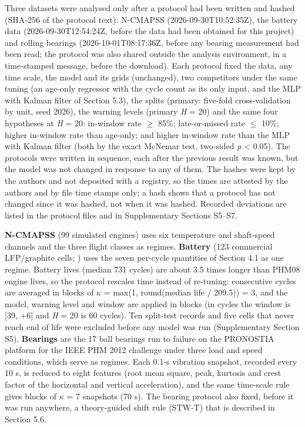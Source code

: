 \documentclass[a4paper,fleqn,doubleblind]{cas-dc}
\begin{document}
Three datasets were analysed only after a protocol had been written and hashed (SHA-256 of the protocol text): N-CMAPSS (2026-09-30T10:52:35Z), the battery data (2026-09-30T12:54:24Z, before the data had been obtained for this project) and rolling bearings (2026-10-01T08:17:36Z, before any bearing measurement had been read; the protocol was also shared outside the analysis environment, in a time-stamped message, before the download). Each protocol fixed the data, any time scale, the model and its grids (unchanged), two competitors under the same tuning (an age-only regressor with the cycle count as its only input, and the MLP with Kalman filter of Section 5.3), the splits (primary: five-fold cross-validation by unit, seed 2026), the warning levels (primary \textit{H} = 20) and the same four hypotheses at \textit{H} = 20: in-window rate $\ge$ 85\%; late-or-missed rate $\le$ 10\%; higher in-window rate than age-only; and higher in-window rate than the MLP with Kalman filter (both by the exact McNemar test, two-sided \textit{p} < 0.05). The protocols were written in sequence, each after the previous result was known, but the model was not changed in response to any of them. The hashes were kept by the authors and not deposited with a registry, so the times are attested by the authors and by file time stamps only; a hash shows that a protocol has not changed since it was hashed, not when it was hashed. Recorded deviations are listed in the protocol files and in Supplementary Sections S5--S7.

\textbf{N-CMAPSS} (99 simulated engines) uses six temperature and shaft-speed channels and the three flight classes as regimes. \textbf{Battery} (123 commercial LFP/graphite cells; \cite{severson2019}) uses the seven per-cycle quantities of Section 4.1 as one regime. Battery lives (median 731 cycles) are about 3.5 times longer than PHM08 engine lives, so the protocol rescales time instead of re-tuning: consecutive cycles are averaged in blocks of $\kappa$ = max(1, round(median life / 209.5)) = 3, and the model, warning level and window are applied in blocks (in cycles the window is [\textminus{}39, +6] and \textit{H} = 20 is 60 cycles). Ten split-test records and five cells that never reach end of life were excluded before any model was run (Supplementary Section S5). \textbf{Bearings} are the 17 ball bearings run to failure on the PRONOSTIA platform for the IEEE PHM 2012 challenge \cite{nectoux2012} under three load and speed conditions, which serve as regimes. Each 0.1-s vibration snapshot, recorded every 10 s, is reduced to eight features (root mean square, peak, kurtosis and crest factor of the horizontal and vertical acceleration), and the same time-scale rule gives blocks of $\kappa$ = 7 snapshots (70 s). The bearing protocol also fixed, before it was run anywhere, a theory-guided shift rule (STW-T) that is described in Section 5.6.
\end{document}

